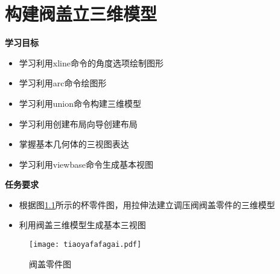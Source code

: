 \chapter{构建阀盖立三维模型}

{\bfseries 学习目标}
\begin{itemize}
\item 学习利用xline命令的角度选项绘制图形
\item 学习利用arc命令绘图形
\item 学习利用union命令构建三维模型
\item 学习利用创建布局向导创建布局
\item 掌握基本几何体的三视图表达
\item 学习利用viewbase命令生成基本视图
\end{itemize}

{\bfseries 任务要求}
\begin{itemize}
\item 根据图\ref{fig:tiaoyafafagai}所示的杯零件图，用拉伸法建立调压阀阀盖零件的三维模型
\item 利用阀盖三维模型生成基本三视图
\end{itemize}

\noindent
\begin{figure}[htbp]
\centering
\texttt{[image: tiaoyafafagai.pdf]}
\caption{阀盖零件图}\label{fig:tiaoyafafagai}
\end{figure}
\endinput